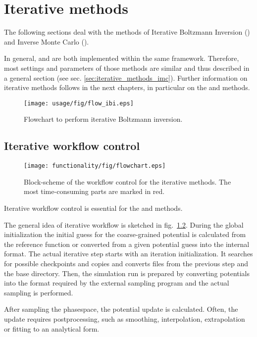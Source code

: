 \chapter{Iterative methods}
\label{sec:iterative_methods}

The following sections deal with the methods of Iterative Boltzmann Inversion (\ibi) and Inverse Monte Carlo (\imc).

In general, \ibi and \imc are both implemented within the same framework. Therefore, most settings and parameters of those methods are similar and thus described in a general section (see sec. \ref{sec:iterative_methods_imc}). Further information on iterative methods follows in the next chapters, in particular on the \ibi and \imc methods.

\begin{figure}[h]
   \centering
   \texttt{[image: usage/fig/flow\_ibi.eps]}
   \caption{\label{fig:flow_ibi}Flowchart to perform iterative Boltzmann inversion.}
\end{figure}

\section{Iterative workflow control}
\label{sec:iterative_workflow}

\begin{figure}[t]
   \centering
   \texttt{[image: functionality/fig/flowchart.eps]}
   \caption{\label{fig:flowchart}Block-scheme of the workflow control for the iterative methods. The most time-consuming parts are marked in red.}
\end{figure}

Iterative workflow control is essential for the \ibi and \imc methods.

The general idea of iterative workflow is sketched in fig.~\ref{fig:flowchart}. During the global initialization the initial guess for the coarse-grained potential is calculated from the reference function or converted from a given potential guess into the internal format. The actual iterative step starts with an iteration initialization. It searches for possible checkpoints and copies and converts files from the previous step and the base directory. Then, the simulation run is prepared by converting potentials into the format required by the external sampling program and the actual sampling is performed. 

After sampling the phasespace, the potential update is calculated. Often, the update requires postprocessing, such as smoothing, interpolation, extrapolation or fitting to an analytical form.


